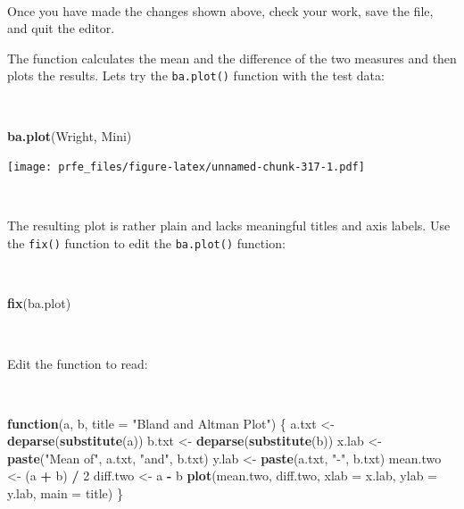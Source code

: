 \documentclass[12pt,a4paper]{book}
\newenvironment{Shaded}{\begin{snugshade}}{\end{snugshade}}
\newcommand{\KeywordTok}[1]{\textcolor[rgb]{0.13,0.29,0.53}{\textbf{#1}}}
\newcommand{\DataTypeTok}[1]{\textcolor[rgb]{0.13,0.29,0.53}{#1}}
\newcommand{\DecValTok}[1]{\textcolor[rgb]{0.00,0.00,0.81}{#1}}
\newcommand{\StringTok}[1]{\textcolor[rgb]{0.31,0.60,0.02}{#1}}
\newcommand{\ControlFlowTok}[1]{\textcolor[rgb]{0.13,0.29,0.53}{\textbf{#1}}}
\newcommand{\OperatorTok}[1]{\textcolor[rgb]{0.81,0.36,0.00}{\textbf{#1}}}
\newcommand{\NormalTok}[1]{#1}
\theoremstyle{definition}
\theoremstyle{definition}
\theoremstyle{definition}
\theoremstyle{remark}
\begin{document}
~

Once you have made the changes shown above, check your work, save the
file, and quit the editor.

The function calculates the mean and the difference of the two measures
and then plots the results. Lets try the \texttt{ba.plot()} function
with the test data:

~

\begin{Shaded}
\begin{Highlighting}[]
\KeywordTok{ba.plot}\NormalTok{(Wright, Mini)}
\end{Highlighting}
\end{Shaded}

\texttt{[image: prfe\_files/figure-latex/unnamed-chunk-317-1.pdf]}

~

The resulting plot is rather plain and lacks meaningful titles and axis
labels. Use the \texttt{fix()} function to edit the \texttt{ba.plot()}
function:

~

\begin{Shaded}
\begin{Highlighting}[]
\KeywordTok{fix}\NormalTok{(ba.plot)}
\end{Highlighting}
\end{Shaded}

~

Edit the function to read:

~

\begin{Shaded}
\begin{Highlighting}[]
\ControlFlowTok{function}\NormalTok{(a, b, }\DataTypeTok{title =} \StringTok{"Bland and Altman Plot"}\NormalTok{) \{}
\NormalTok{  a.txt <-}\StringTok{ }\KeywordTok{deparse}\NormalTok{(}\KeywordTok{substitute}\NormalTok{(a))}
\NormalTok{  b.txt <-}\StringTok{ }\KeywordTok{deparse}\NormalTok{(}\KeywordTok{substitute}\NormalTok{(b))}
\NormalTok{  x.lab <-}\StringTok{ }\KeywordTok{paste}\NormalTok{(}\StringTok{"Mean of"}\NormalTok{, a.txt, }\StringTok{"and"}\NormalTok{, b.txt)}
\NormalTok{  y.lab <-}\StringTok{ }\KeywordTok{paste}\NormalTok{(a.txt, }\StringTok{"-"}\NormalTok{, b.txt)}
\NormalTok{  mean.two <-}\StringTok{ }\NormalTok{(a }\OperatorTok{+}\StringTok{ }\NormalTok{b) }\OperatorTok{/}\StringTok{ }\DecValTok{2}
\NormalTok{  diff.two <-}\StringTok{ }\NormalTok{a }\OperatorTok{-}\StringTok{ }\NormalTok{b}
  \KeywordTok{plot}\NormalTok{(mean.two, diff.two, }\DataTypeTok{xlab =}\NormalTok{ x.lab, }\DataTypeTok{ylab =}\NormalTok{ y.lab, }\DataTypeTok{main =}\NormalTok{ title)}
\NormalTok{\}}
\end{Highlighting}
\end{Shaded}
\end{document}
